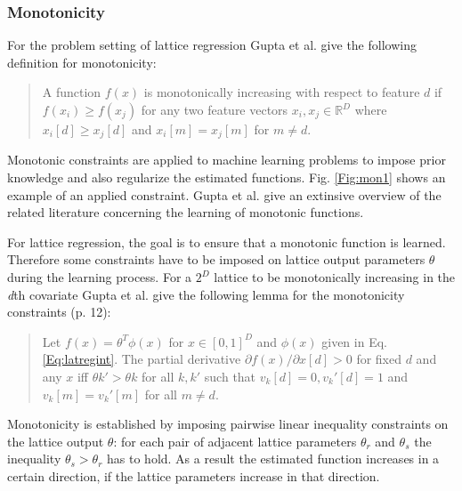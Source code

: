 \subsubsection{Monotonicity}

For the problem setting of lattice regression Gupta et al. give the following definition for monotonicity:
\vspace*{-1cm}
\begin{quote}
	\begin{defin*}
		A function $f(x)$ is monotonically increasing with respect to feature $d$ if $f(x_i) \geq f(x_j)$ for any two feature vectors $x_i,x_j \in \mathbb{R}^D$ where $x_i[d] \geq x_j[d]$ and $x_i[m] = x_j[m]$ for $m \neq d$. 
	\end{defin*}
\end{quote}
Monotonic constraints are applied to machine learning problems to impose prior knowledge and also regularize the estimated functions. Fig. \ref{Fig:mon1} shows an example of an applied constraint. Gupta et al. give an extinsive overview of the related literature concerning the learning of monotonic functions.

For lattice regression, the goal is to ensure that a monotonic function is learned. Therefore some constraints have to be imposed on lattice output parameters $\theta$ during the learning process. For a $2^D$ lattice to be monotonically increasing in the \textit{d}th covariate Gupta et al. give the following lemma for the monotonicity constraints (p. 12):
\vspace*{-1cm}
\begin{quote}
	\begin{lemma*}
		Let $f(x) = \theta^T\phi(x)$ for $x \in [0, 1]^D$ and $\phi(x)$ given in Eq. \ref{Eq:latregint}. The partial derivative $\partial f(x)/\partial x[d] > 0$ for fixed $d$ and any $x$ iff $\theta k' > \theta k$ for all $k,k'$ such that $v_k[d] = 0, v_k'[d] = 1$ and $v_k[m] = v_k'[m]$ for all $m \neq d$. 
	\end{lemma*} 
\end{quote}
Monotonicity is established by imposing pairwise linear inequality constraints on the lattice output $\theta$: for each pair of adjacent lattice parameters $\theta_r$ and $\theta_s$ the inequality $\theta_s > \theta_r$ has to hold. As a result the estimated function increases in a certain direction, if the lattice parameters increase in that direction.

